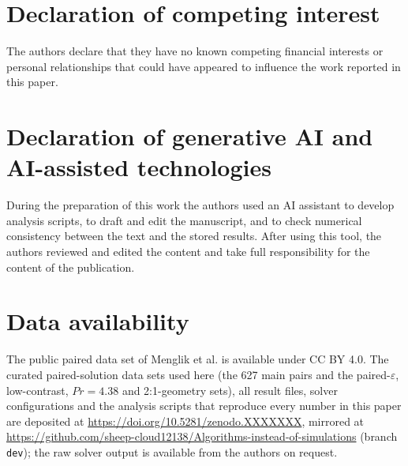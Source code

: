 \documentclass[preprint,11pt,a4paper,times]{elsarticle}
\begin{document}
\section*{Declaration of competing interest}

The authors declare that they have no known competing financial interests or personal
relationships that could have appeared to influence the work reported in this paper.

\section*{Declaration of generative AI and AI-assisted technologies}

During the preparation of this work the authors used an AI assistant to develop analysis
scripts, to draft and edit the manuscript, and to check numerical consistency between the text
and the stored results. After using this tool, the authors reviewed and edited the content and
take full responsibility for the content of the publication.

\section*{Data availability}

\begin{sloppypar}
The public paired data set of Menglik et al. \citep{menglik2026neural} is available under CC BY 4.0.
The curated paired-solution data sets used here (the 627 main pairs and the
paired-$\varepsilon$, low-contrast, $Pr=4.38$ and 2:1-geometry sets), all result files, solver
configurations and the analysis scripts that reproduce every number in this paper are deposited
at
\url{https://doi.org/10.5281/zenodo.XXXXXXX}, mirrored at
\url{https://github.com/sheep-cloud12138/Algorithms-instead-of-simulations} (branch
\texttt{dev}); the raw solver output is available from the authors on request.
\end{sloppypar}


\renewcommand{\bibfont}{\small}
\setlength{\bibsep}{1pt}

\end{document}
